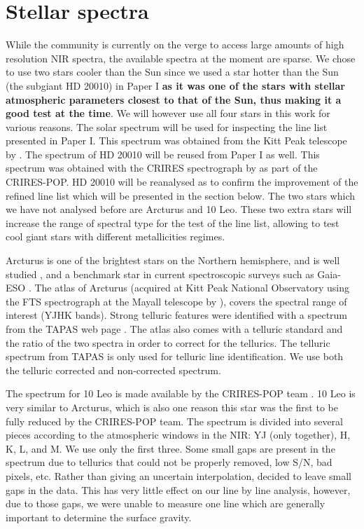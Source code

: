 \documentclass{aa}
\begin{document}
\section{Stellar spectra}
\label{sec:data}

While the community is currently on the verge to access large amounts of high resolution NIR
spectra, the available spectra at the moment are sparse. We chose to use two stars cooler than the
Sun since we used a star hotter than the Sun (the subgiant HD 20010) in Paper I {\bf as it was one
of the stars with stellar atmospheric parameters closest to that of the Sun, thus making it a good
test at the time}. We will however use all four stars in this work for various reasons. The
solar spectrum will be used for inspecting the line list presented in Paper I. This spectrum was
obtained from the Kitt Peak telescope by \citet{Hinkle1995}. The spectrum of HD 20010 will be reused
from Paper I as well. This spectrum was obtained with the CRIRES spectrograph by
\citet{Lebzelter2012} as part of the CRIRES-POP. HD 20010 will be reanalysed as to confirm the
improvement of the refined line list which will be presented in the section below. The two stars
which we have not analysed before are Arcturus and 10 Leo. These two extra stars will increase the
range of spectral type for the test of the line list, allowing to test cool giant stars with
different metallicities regimes.


Arcturus is one of the brightest stars on the Northern hemisphere, and is well
studied \citep[see e.g.][to mention just a
few]{Griffin1967,McWilliam1990,Ramirez2013}, and a benchmark star in
current spectroscopic surveys such as Gaia-ESO \citep{Jofre2014,Smiljanic2014}.
The atlas of Arcturus (acquired at Kitt Peak National Observatory using the FTS
spectrograph at the Mayall telescope by \citet{Hinkle1995a}), covers the
spectral range of interest (YJHK bands). Strong telluric features were
identified with a spectrum from the TAPAS web page \citep{Bertaux2014}. The
atlas also comes with a telluric standard and the ratio of the two spectra in
order to correct for the tellurics. The telluric spectrum from TAPAS is only
used for telluric line identification. We use both the telluric corrected and
non-corrected spectrum.

The spectrum for 10 Leo is made available by the CRIRES-POP team
\citep{Nicholls2017}. 10 Leo is very similar to Arcturus, which is also one
reason this star was the first to be fully reduced by the CRIRES-POP team. The
spectrum is divided into several pieces according to the atmospheric windows in
the NIR: YJ (only together), H, K, L, and M. We use only the first three. Some
small gaps are present in the spectrum due to tellurics that could not be
properly removed, low S/N, bad pixels, etc. Rather than giving an uncertain
interpolation, \citet{Nicholls2017} decided to leave small gaps in the data.
This has very little effect on our line by line analysis, however, due to those
gaps, we were unable to measure one  line which are generally
important to determine the surface gravity.
\end{document}
